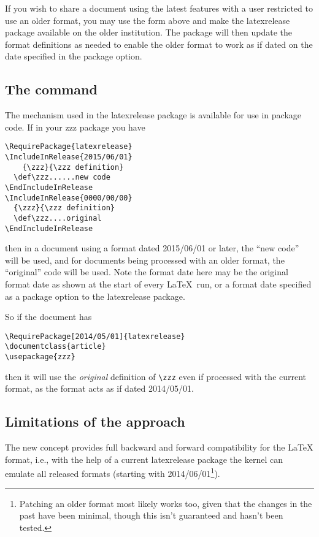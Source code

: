 \documentclass{ltnews}
\begin{document}
If you wish to share a document using the latest features with a
user restricted to use an older
format, you may use the form above and make the \textsf{latexrelease} package
available on the older institution.  The package will then update the format
definitions as needed to enable the older format to work as if dated on the date
specified in the package option.

\subsection{The  command}

The mechanism used in the \textsf{latexrelease} package is available for use in
package code. If in your \textsf{zzz} package you have
\begin{verbatim}
\RequirePackage{latexrelease}
\IncludeInRelease{2015/06/01}
    {\zzz}{\zzz definition}
  \def\zzz......new code
\EndIncludeInRelease
\IncludeInRelease{0000/00/00}
  {\zzz}{\zzz definition}
  \def\zzz....original
\EndIncludeInRelease
\end{verbatim}
then in a document using a format dated 2015/06/01 or later, the ``new code''
will be used, and for documents being processed with an older format, the
``original'' code will be used. Note the format date here may be the original
format date as shown at the start of every \LaTeX\ run, or a format date
specified as a package option to the \textsf{latexrelease} package. 

So if the document has
\begin{verbatim}
\RequirePackage[2014/05/01]{latexrelease}
\documentclass{article}
\usepackage{zzz}
\end{verbatim}
then it will use the \emph{original} definition of \verb|\zzz| even if
processed with the current format, as the format acts as if dated 2014/05/01.


\subsection{Limitations of the approach}

The new concept provides full backward and forward compatibility for
the \LaTeX{} format, i.e., with the help of a current
\textsf{latexrelease} package the kernel can emulate all released
formats (starting with 2014/06/01\footnote{Patching an older format
  most likely works too, given that the changes in the past have been
  minimal, though this isn't guaranteed and hasn't been tested.}).
\end{document}
